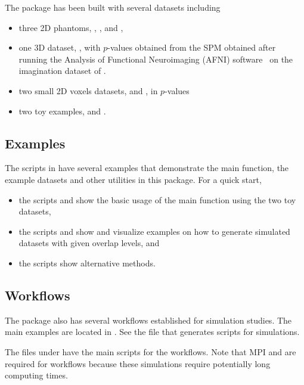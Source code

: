 The package has been built with several datasets including
\begin{itemize}
\item
three 2D phantoms, , , and ,
\item
one 3D dataset, , with $p$-values obtained from the SPM
obtained after running the Analysis of Functional Neuroimaging (AFNI)
software~\citep{cox96,coxandhyde97,cox12} on the imagination dataset of
\citet{tabelowandpolzehl11}. 
\item 
two small 2D voxels datasets,  and ,
in $p$-values
\item
two toy examples,  and .
\end{itemize}


\subsection[Examples]{Examples}
The scripts in  have several examples that demonstrate
the main function, the example datasets and other utilities in this package.
For a quick start,
\begin{itemize}
\item
the scripts  and 
show the basic usage of the main function  using the
two toy datasets,
\item
the scripts  and
 show and visualize
examples on how to generate simulated datasets with given overlap levels, and
\item
the scripts  show alternative methods.
\end{itemize}


\subsection[Workflows]{Workflows}
\label{sec:workflows}
The package also has several workflows established for simulation studies.
The main examples are located in .
See the file  that generates scripts for simulations.

The files under  have the main
scripts for the workflows.
Note that MPI and  are required for workflows because these
simulations require potentially long computing times.

